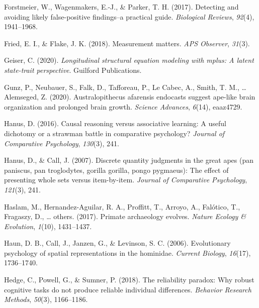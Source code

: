 \documentclass[
  man,floatsintext]{apa6}
\newlength{\cslhangindent}
\newlength{\cslentryspacingunit} %
\newenvironment{CSLReferences}[2] %
 {%
  \setlength{\parindent}{0pt}
  \ifodd #1
  \let\oldpar\par
  \def\par{\hangindent=\cslhangindent\oldpar}
  \fi
  \setlength{\parskip}{#2\cslentryspacingunit}
 }%
 {}
\begin{document}
\begin{CSLReferences}{1}{0}
\leavevmode{}%
Forstmeier, W., Wagenmakers, E.-J., \& Parker, T. H. (2017). Detecting and avoiding likely false-positive findings--a practical guide. \emph{Biological Reviews}, \emph{92}(4), 1941--1968.

\leavevmode{}%
Fried, E. I., \& Flake, J. K. (2018). Measurement matters. \emph{APS Observer}, \emph{31}(3).

\leavevmode{}%
Geiser, C. (2020). \emph{Longitudinal structural equation modeling with mplus: A latent state-trait perspective}. Guilford Publications.

\leavevmode{}%
Gunz, P., Neubauer, S., Falk, D., Tafforeau, P., Le Cabec, A., Smith, T. M., \ldots{} Alemseged, Z. (2020). Australopithecus afarensis endocasts suggest ape-like brain organization and prolonged brain growth. \emph{Science Advances}, \emph{6}(14), eaaz4729.

\leavevmode{}%
Hanus, D. (2016). Causal reasoning versus associative learning: A useful dichotomy or a strawman battle in comparative psychology? \emph{Journal of Comparative Psychology}, \emph{130}(3), 241.

\leavevmode{}%
Hanus, D., \& Call, J. (2007). Discrete quantity judgments in the great apes (pan paniscus, pan troglodytes, gorilla gorilla, pongo pygmaeus): The effect of presenting whole sets versus item-by-item. \emph{Journal of Comparative Psychology}, \emph{121}(3), 241.

\leavevmode{}%
Haslam, M., Hernandez-Aguilar, R. A., Proffitt, T., Arroyo, A., Falótico, T., Fragaszy, D., \ldots{} others. (2017). Primate archaeology evolves. \emph{Nature Ecology \& Evolution}, \emph{1}(10), 1431--1437.

\leavevmode{}%
Haun, D. B., Call, J., Janzen, G., \& Levinson, S. C. (2006). Evolutionary psychology of spatial representations in the hominidae. \emph{Current Biology}, \emph{16}(17), 1736--1740.

\leavevmode{}%
Hedge, C., Powell, G., \& Sumner, P. (2018). The reliability paradox: Why robust cognitive tasks do not produce reliable individual differences. \emph{Behavior Research Methods}, \emph{50}(3), 1166--1186.


\end{CSLReferences}
\end{document}
